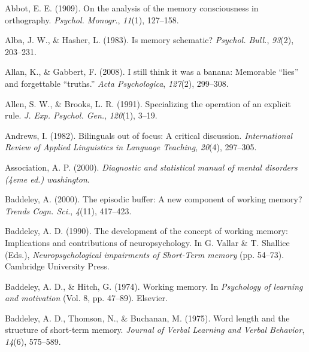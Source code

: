 \documentclass[
]{krantz}
\newlength{\cslhangindent}
\newlength{\cslentryspacingunit} %
\newenvironment{CSLReferences}[2] %
 {%
  \setlength{\parindent}{0pt}
  \ifodd #1
  \let\oldpar\par
  \def\par{\hangindent=\cslhangindent\oldpar}
  \fi
  \setlength{\parskip}{#2\cslentryspacingunit}
 }%
 {}
\begin{document}
\hypertarget{refs}{}
\begin{CSLReferences}{1}{0}
\leavevmode{}%
Abbot, E. E. (1909). On the analysis of the memory consciousness in orthography. \emph{Psychol. Monogr.}, \emph{11}(1), 127--158.

\leavevmode{}%
Alba, J. W., \& Hasher, L. (1983). Is memory schematic? \emph{Psychol. Bull.}, \emph{93}(2), 203--231.

\leavevmode{}%
Allan, K., \& Gabbert, F. (2008). I still think it was a banana: Memorable {``lies''} and forgettable {``truths.''} \emph{Acta Psychologica}, \emph{127}(2), 299--308.

\leavevmode{}%
Allen, S. W., \& Brooks, L. R. (1991). Specializing the operation of an explicit rule. \emph{J. Exp. Psychol. Gen.}, \emph{120}(1), 3--19.

\leavevmode{}%
Andrews, I. (1982). Bilinguals out of focus: A critical discussion. \emph{International Review of Applied Linguistics in Language Teaching}, \emph{20}(4), 297--305.

\leavevmode{}%
Association, A. P. (2000). \emph{Diagnostic and statistical manual of mental disorders (4eme ed.) washington}.

\leavevmode{}%
Baddeley, A. (2000). The episodic buffer: A new component of working memory? \emph{Trends Cogn. Sci.}, \emph{4}(11), 417--423.

\leavevmode{}%
Baddeley, A. D. (1990). The development of the concept of working memory: Implications and contributions of neuropsychology. In G. Vallar \& T. Shallice (Eds.), \emph{Neuropsychological impairments of {Short-Term} memory} (pp. 54--73). Cambridge University Press.

\leavevmode{}%
Baddeley, A. D., \& Hitch, G. (1974). Working memory. In \emph{Psychology of learning and motivation} (Vol. 8, pp. 47--89). Elsevier.

\leavevmode{}%
Baddeley, A. D., Thomson, N., \& Buchanan, M. (1975). Word length and the structure of short-term memory. \emph{Journal of Verbal Learning and Verbal Behavior}, \emph{14}(6), 575--589.


\end{CSLReferences}
\end{document}
